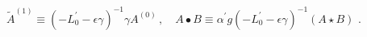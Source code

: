 \begin{equation}
\tilde{A}^{\left( 1\right) }\equiv (-L_{0}^{\prime }-\epsilon \gamma
)^{-1}\gamma A^{\left( 0\right) }\,,\quad A\bullet B\equiv {\alpha ^{\prime }%
}g(-L_{0}^{\prime }-\epsilon \gamma )^{-1}(A\star B)\,\,.
\end{equation}%
